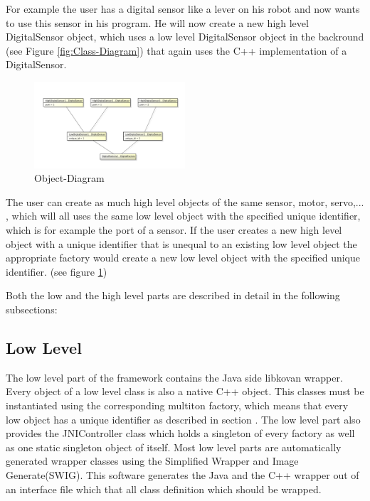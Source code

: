 \documentclass{juniorjournal}
\begin{document}
For example the user has a digital sensor like a lever on his robot and now 
wants to use this sensor in his program. He will now create a new high level 
DigitalSensor object, which uses a low level DigitalSensor object in the 
backround (see Figure \ref{fig:Class-Diagram}) that again uses the C++ implementation of a DigitalSensor.

\begin{figure}[H]
\centering
\includegraphics[width=0.5\textwidth]{images/Object-Diagram.pdf}
\caption{Object-Diagram}
\label{fig:Object-Diagram}
\end{figure}

The user can create as much high level objects of the same sensor, motor, 
servo,... , which will all uses the same low level object with the specified 
unique identifier, which is for example the port of a sensor. If the user 
creates a new high level object with a unique identifier that is unequal to 
an existing low level object the appropriate factory would 
create a new low level object with the specified unique identifier. (see figure \ref{fig:Object-Diagram})

Both the low and the high level parts are described in detail in the following subsections:

\subsection{Low Level}
The low level part of the framework contains the Java\cite{Java} side libkovan\cite{libkovan} wrapper. 
Every object of a low level class is also a native C++ object.
This classes must be instantiated using the corresponding multiton factory, which means that every low object has a unique identifier as described in section .
The low level part also provides the JNIController class which holds a singleton of every factory as well as one static singleton object of itself.
Most low level parts are automatically generated wrapper classes using the Simplified Wrapper and Image Generate(SWIG).
This software generates the Java and the C++ wrapper out of an interface file which that all class definition which should be wrapped.
\end{document}
